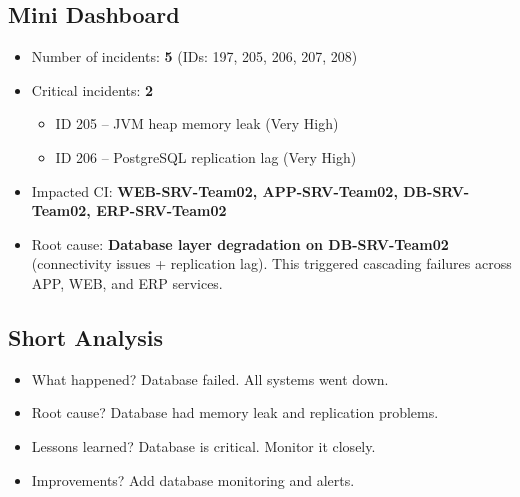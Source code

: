 \documentclass[12pt,a4paper]{article}
\begin{document}
\subsection*{Mini Dashboard}
\begin{itemize}
    \item Number of incidents: \textbf{5} (IDs: 197, 205, 206, 207, 208)
    \item Critical incidents: \textbf{2}
    \begin{itemize}
        \item ID 205 -- JVM heap memory leak (Very High)
        \item ID 206 -- PostgreSQL replication lag (Very High)
    \end{itemize}
    \item Impacted CI: \textbf{WEB-SRV-Team02, APP-SRV-Team02, DB-SRV-Team02, ERP-SRV-Team02}
    \item Root cause: \textbf{Database layer degradation on DB-SRV-Team02} (connectivity issues + replication lag). This triggered cascading failures across APP, WEB, and ERP services.
\end{itemize}

\subsection*{Short Analysis}
\begin{itemize}
    \item What happened? Database failed. All systems went down.
    \item Root cause? Database had memory leak and replication problems.
    \item Lessons learned? Database is critical. Monitor it closely.
    \item Improvements? Add database monitoring and alerts.
\end{itemize}
\end{document}
